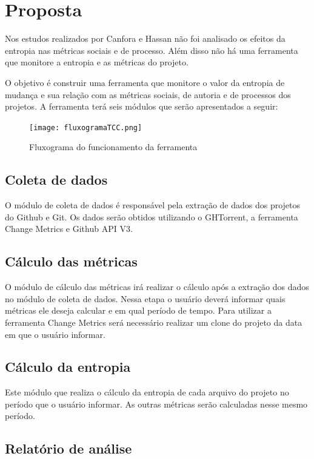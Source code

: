 \chapter{Proposta}
Nos estudos realizados por Canfora e Hassan não foi analisado os efeitos da entropia nas métricas sociais e de processo. Além disso não há uma ferramenta que monitore a entropia e as métricas do projeto.

O objetivo é construir uma ferramenta que monitore o valor da entropia de mudança e sua relação com as métricas sociais, de autoria e de processos dos projetos. A ferramenta terá seis módulos que serão apresentados a seguir:

\begin{figure}[h]
	\captionsetup{justification=centering}
	\texttt{[image: fluxogramaTCC.png]}
	\caption{Fluxograma do funcionamento da ferramenta}
	\label{figura:fluxogramaimagem}
\end{figure}

\section{Coleta de dados}
O módulo de coleta de dados é responsável pela extração de dados dos projetos do Github e Git. Os dados serão obtidos utilizando o GHTorrent, a ferramenta Change Metrics e Github API V3. 

\section{Cálculo das métricas}
O módulo de cálculo das métricas irá realizar o cálculo após a extração dos dados no módulo de coleta de dados. Nessa etapa o usuário deverá informar quais métricas ele deseja calcular e em qual período de tempo. Para utilizar a ferramenta Change Metrics será necessário realizar um clone do projeto da data em que o usuário informar.

\section{Cálculo da entropia}
Este módulo que realiza o cálculo da entropia de cada arquivo do projeto no período que o usuário informar. As outras métricas serão calculadas nesse mesmo período. 

\section{Relatório de análise}

